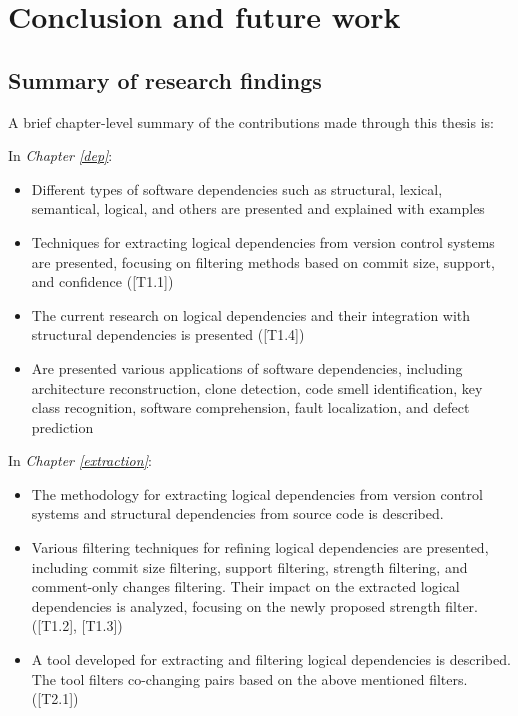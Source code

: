 \chapter{Conclusion and future work}

\section{Summary of research findings}

\hspace{4em}A brief chapter-level summary of the contributions made through this thesis is:

\noindent In \textit{Chapter \ref{dep}}:
\begin{itemize}
    \item Different types of software dependencies such as structural, lexical, semantical, logical, and others are presented and explained with examples
    \item Techniques for extracting logical dependencies from version control systems are presented, focusing on filtering methods based on commit size, support, and confidence \hfill ([T1.1])
    \item The current research on logical dependencies and their integration with structural dependencies is presented \hfill ([T1.4])
    \item Are presented various applications of software dependencies, including architecture reconstruction, clone detection, code smell identification, key class recognition, software comprehension, fault localization, and defect prediction 
\end{itemize}

\noindent In \textit{Chapter \ref{extraction}}:
\begin{itemize}
    \item The methodology for extracting logical dependencies from version control systems and structural dependencies from source code is described. 
    \item Various filtering techniques for refining logical dependencies are presented, including commit size filtering, support filtering, strength filtering, and comment-only changes filtering. Their impact on the extracted logical dependencies is analyzed, focusing on the newly proposed strength filter. \hfill ([T1.2], [T1.3])
    \item A tool developed for extracting and filtering logical dependencies is described. The tool filters co-changing pairs based on the above mentioned filters. \hfill ([T2.1])
\end{itemize}

